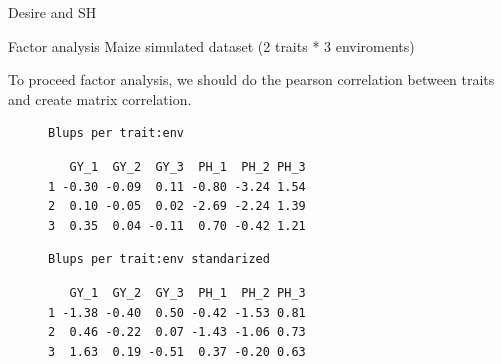 \documentclass[
  ignorenonframetext,
  aspectratio=169,
]{beamer}
\begin{document}
\begin{frame}{Desire and SH}
\begin{table}
\begin{minipage}{0.25\linewidth}
{}

\end{minipage}%
%
\begin{minipage}{0.25\linewidth}



\end{minipage}%

\end{table}%
\end{frame}

\begin{frame}[fragile]{Factor analysis}
\label{factor-analysis}
Maize simulated dataset (2 traits * 3 enviroments)

To proceed factor analysis, we should do the pearson correlation between
traits and create matrix correlation.

\begin{figure}

\begin{minipage}{0.50\linewidth}

\begin{verbatim}
Blups per trait:env
\end{verbatim}

\end{minipage}%
%
\begin{minipage}{0.50\linewidth}

\begin{verbatim}
   GY_1  GY_2  GY_3  PH_1  PH_2 PH_3
1 -0.30 -0.09  0.11 -0.80 -3.24 1.54
2  0.10 -0.05  0.02 -2.69 -2.24 1.39
3  0.35  0.04 -0.11  0.70 -0.42 1.21
\end{verbatim}

\end{minipage}%
\newline
\begin{minipage}{0.50\linewidth}

\begin{verbatim}
Blups per trait:env standarized
\end{verbatim}

\end{minipage}%
%
\begin{minipage}{0.50\linewidth}

\begin{verbatim}
   GY_1  GY_2  GY_3  PH_1  PH_2 PH_3
1 -1.38 -0.40  0.50 -0.42 -1.53 0.81
2  0.46 -0.22  0.07 -1.43 -1.06 0.73
3  1.63  0.19 -0.51  0.37 -0.20 0.63
\end{verbatim}

\end{minipage}%

\end{figure}%
\end{frame}
\end{document}
